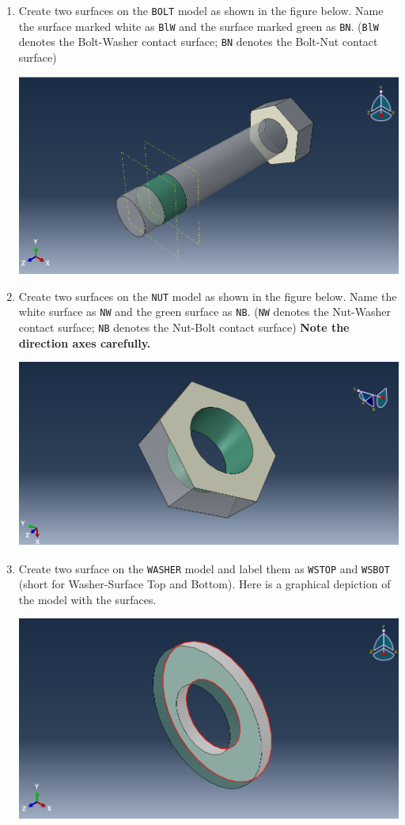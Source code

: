 \documentclass[11pt]{article}
\begin{document}
\begin{enumerate}
\begin{center}
\end{center}
\item Create two surfaces on the \texttt{BOLT} model as shown in the figure below.
Name the surface marked white as \texttt{BlW} and the surface marked green as \texttt{BN}.
(\texttt{BlW} denotes the Bolt-Washer contact surface; \texttt{BN} denotes the Bolt-Nut contact surface)
\begin{center}
\includegraphics[width=.9\linewidth]{./figs/boltsurfs.png}
\end{center}
\item Create two surfaces on the \texttt{NUT} model as shown in the figure below.
Name the white surface as \texttt{NW} and the green surface as \texttt{NB}.
(\texttt{NW} denotes the Nut-Washer contact surface; \texttt{NB} denotes the Nut-Bolt contact surface)
\textbf{Note the direction axes carefully.}
\begin{center}
\includegraphics[width=.9\linewidth]{./figs/nutsurfs.png}
\end{center}
\item Create two surface on the \texttt{WASHER} model and label them as \texttt{WSTOP} and \texttt{WSBOT} (short for Washer-Surface Top and Bottom).
Here is a graphical depiction of the model with the surfaces.
\begin{center}
\includegraphics[width=.9\linewidth]{./figs/wshrsurf.png}

\end{center}
\end{enumerate}
\end{document}
